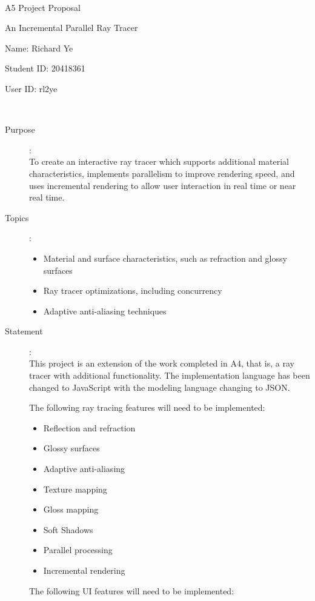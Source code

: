 \documentclass[12pt]{article}
\begin{document}
~\vfill
\begin{center}
\Large

A5 Project Proposal

An Incremental Parallel Ray Tracer

Name: Richard Ye

Student ID: 20418361

User ID: rl2ye
\end{center}
\vfill ~\vfill~
\newpage
{}
\begin{description}
\item[Purpose]:\\
	To create an interactive ray tracer which supports additional material
	characteristics, implements parallelism to improve rendering speed,
	and uses incremental rendering to allow user interaction in real time
	or near real time.

\item[Topics]:
	\begin{itemize}
	\item Material and surface characteristics, such as refraction and glossy surfaces
	\item Ray tracer optimizations, including concurrency
	\item Adaptive anti-aliasing techniques
	\end{itemize}

\item[Statement]:\\
	This project is an extension of the work completed in A4, that is, a ray tracer
	with additional functionality. The implementation language has been changed to
	JavaScript with the modeling language changing to JSON.
	
	The following ray tracing features will need to be implemented:
	
	\begin{itemize}
	\item Reflection and refraction
	\item Glossy surfaces
	\item Adaptive anti-aliasing
	\item Texture mapping
	\item Gloss mapping
	\item Soft Shadows
	\item Parallel processing
	\item Incremental rendering
	\end{itemize}
	
	The following UI features will need to be implemented:
	

\end{description}
\end{document}
